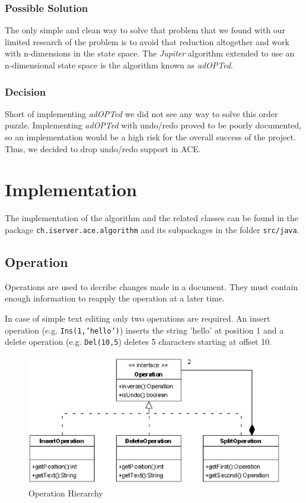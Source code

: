 \subsubsection{Possible Solution}
The only simple and clean way to solve that problem that we found with our
limited research of the problem is to avoid that reduction altogether and
work with n-dimensions in the state space. The \emph{Jupiter} algorithm
extended to use an n-dimensional state space is the algorithm
known as \emph{adOPTed}.

\subsubsection{Decision}
Short of implementing \emph{adOPTed} we did not see any way to solve
this order puzzle. Implementing \emph{adOPTed} with undo/redo proved to
be poorly documented, so an implementation would be a high risk for the
overall success of the project. Thus, we decided to drop undo/redo support in 
ACE.


\section{Implementation}
The implementation of the algorithm and the related classes can be found
in the package \texttt{ch.\-iserver.\-ace.\-algorithm} and its subpackages
in the folder \texttt{src/java}.

\subsection{Operation}
Operations are used to decribe changes made in a document. They must contain
enough information to reapply the operation at a later time.

In case of simple text editing only two operations are required. An insert 
operation (e.g. \texttt{Ins(1,'hello')}) inserts the string 'hello' at position 
1 and a delete operation (e.g. \texttt{Del(10,5}) deletes 5 characters
starting at offset 10.

\begin{figure}[H]
\centering
\includegraphics[height=5.74cm,width=11.59cm]{../images/finalreport/algorithm_operation.eps}
\caption{Operation Hierarchy}
\label{Operation Hierarchy}
\end{figure}

